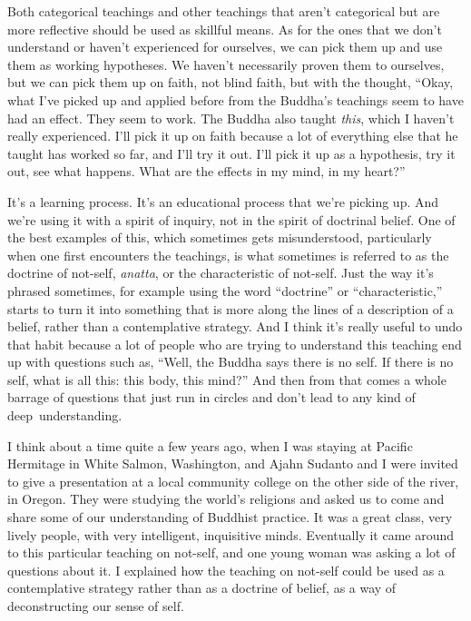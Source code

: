 Both categorical teachings and other teachings that aren't categorical but are more reflective should be used as skillful means. As for the ones that we don't \mbox{understand} or haven't experienced for ourselves, we can pick them up and use them \linebreak as working hypotheses. We haven't necessarily proven \linebreak them to ourselves, but we can pick them up on faith, not blind faith, but with the thought, ``Okay, what I've picked up and applied before from the Buddha's teachings seem to have had an effect. They seem to work. The Buddha also taught \emph{this}, which I haven't really experienced. I'll pick it up on faith because a lot of everything else that he taught has worked so far, and I'll try it out. I'll pick it up as a hypothesis, try it out, see what happens. What are the effects in my mind, in my heart?''

It's a learning process. It's an educational process that we're picking up. And we're using it with a spirit of inquiry, not in the spirit of doctrinal belief. One of the best examples of this, which sometimes gets misunderstood, particularly when one first encounters the teachings, is what sometimes is referred to as the doctrine of not-self, \emph{anatta}, or the characteristic of not-self. Just the way it's phrased sometimes, for example using the word ``doctrine'' or ``characteristic,'' starts to turn it into something that is more along the lines of a description of a belief, rather than a contemplative strategy. And I think it's really useful to undo that habit because a lot of people who are trying to understand this teaching end up with questions such as, ``Well, the Buddha says there is no self. If there is no self, what is all this: this body, this mind?'' And then from that comes a whole barrage of \linebreak questions that just run in circles and don't lead to any kind of \mbox{deep understanding.}

I think about a time quite a few years ago, when I was staying at Pacific Hermitage in White Salmon, Washington, and Ajahn Sudanto and I were invited to give a presentation at a local community college on the other side of the river, in Oregon. They were studying the world's religions and asked us to come and share some of our understanding of Buddhist practice. It was a great class, very lively people, with very intelligent, inquisitive minds. Eventually it came around to this particular teaching on not-self, and one young woman was asking a lot of questions about it. I explained how the teaching on not-self could be used as a contemplative strategy rather than as a doctrine of belief, as a way of deconstructing our sense of self.

